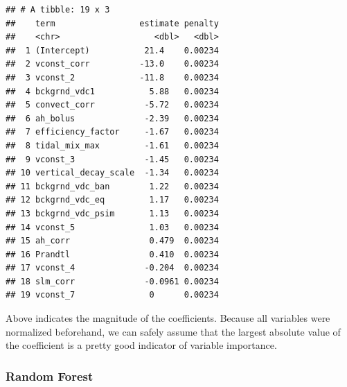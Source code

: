 \documentclass[
  11pt,
]{article}
\newenvironment{Shaded}{\begin{snugshade}}{\end{snugshade}}
\newcommand{\CommentTok}[1]{\textcolor[rgb]{0.56,0.35,0.01}{\textit{#1}}}
\newcommand{\DataTypeTok}[1]{\textcolor[rgb]{0.13,0.29,0.53}{#1}}
\newcommand{\DecValTok}[1]{\textcolor[rgb]{0.00,0.00,0.81}{#1}}
\newcommand{\KeywordTok}[1]{\textcolor[rgb]{0.13,0.29,0.53}{\textbf{#1}}}
\newcommand{\NormalTok}[1]{#1}
\newcommand{\OperatorTok}[1]{\textcolor[rgb]{0.81,0.36,0.00}{\textbf{#1}}}
\newcommand{\StringTok}[1]{\textcolor[rgb]{0.31,0.60,0.02}{#1}}
\begin{document}
\begin{verbatim}
## # A tibble: 19 x 3
##    term                 estimate penalty
##    <chr>                   <dbl>   <dbl>
##  1 (Intercept)           21.4    0.00234
##  2 vconst_corr          -13.0    0.00234
##  3 vconst_2             -11.8    0.00234
##  4 bckgrnd_vdc1           5.88   0.00234
##  5 convect_corr          -5.72   0.00234
##  6 ah_bolus              -2.39   0.00234
##  7 efficiency_factor     -1.67   0.00234
##  8 tidal_mix_max         -1.61   0.00234
##  9 vconst_3              -1.45   0.00234
## 10 vertical_decay_scale  -1.34   0.00234
## 11 bckgrnd_vdc_ban        1.22   0.00234
## 12 bckgrnd_vdc_eq         1.17   0.00234
## 13 bckgrnd_vdc_psim       1.13   0.00234
## 14 vconst_5               1.03   0.00234
## 15 ah_corr                0.479  0.00234
## 16 Prandtl                0.410  0.00234
## 17 vconst_4              -0.204  0.00234
## 18 slm_corr              -0.0961 0.00234
## 19 vconst_7               0      0.00234
\end{verbatim}

Above indicates the magnitude of the coefficients. Because all variables
were normalized beforehand, we can safely assume that the largest
absolute value of the coefficient is a pretty good indicator of variable
importance.

\hypertarget{random-forest}{%
\subsubsection{Random Forest}\label{random-forest}}

\begin{Shaded}
\end{Shaded}
\end{document}
